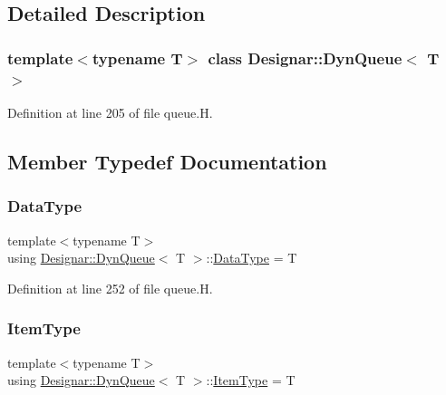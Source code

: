 \subsection{Detailed Description}
\subsubsection*{template$<$typename T$>$\newline
class Designar\+::\+Dyn\+Queue$<$ T $>$}



Definition at line 205 of file queue.\+H.



\subsection{Member Typedef Documentation}
\mbox{\label{class_designar_1_1_dyn_queue_a79504f1ab8156a3eaee8c9c0aaaf1b8a}} 
\subsubsection{\texorpdfstring{Data\+Type}{DataType}}
{\footnotesize\ttfamily template$<$typename T$>$ \\
using \hyperlink{class_designar_1_1_dyn_queue}{Designar\+::\+Dyn\+Queue}$<$ T $>$\+::\hyperlink{class_designar_1_1_fixed_array_a3e37931b909b840cb7a40fc73f12bcf5}{Data\+Type} =  T}



Definition at line 252 of file queue.\+H.

\mbox{\label{class_designar_1_1_dyn_queue_a45a4b5b9dd6a921dbc6919802d34dd9e}} 
\subsubsection{\texorpdfstring{Item\+Type}{ItemType}}
{\footnotesize\ttfamily template$<$typename T$>$ \\
using \hyperlink{class_designar_1_1_dyn_queue}{Designar\+::\+Dyn\+Queue}$<$ T $>$\+::\hyperlink{class_designar_1_1_fixed_array_abfeb4e683cee75ae782ad20294c4c808}{Item\+Type} =  T}



